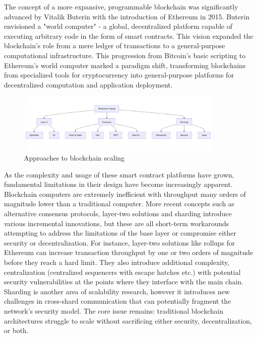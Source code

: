 \documentclass{article}
\begin{document}
The concept of a more expansive, programmable blockchain was significantly advanced by Vitalik Buterin with the introduction of Ethereum in 2015. Buterin envisioned a "world computer" - a global, decentralized platform capable of executing arbitrary code in the form of smart contracts. This vision expanded the blockchain's role from a mere ledger of transactions to a general-purpose computational infrastructure. This progression from Bitcoin's basic scripting to Ethereum's world computer marked a paradigm shift, transforming blockchains from specialized tools for cryptocurrency into general-purpose platforms for decentralized computation and application deployment.

\begin{figure}[H]
    \centering
    \includegraphics[width=0.9\textwidth]{scaling.png}
    \caption{Approaches to blockchain scaling}
    \label{fig:scaling}
\end{figure}


As the complexity and usage of these smart contract platforms have grown, fundamental limitations in their design have become increasingly apparent. Blockchain computers are extremely inefficient with throughput many orders of magnitude lower than a traditional computer. More recent concepts such as alternative consensus protocols, layer-two solutions and sharding introduce various incremental innovations, but these are all short-term workarounds attempting to address the limitations of the base layer or compromise either security or decentralization. For instance, layer-two solutions like rollups for Ethereum can increase transaction throughput by one or two orders of magnitude before they reach a hard limit. They also introduce additional complexity, centralization (centralized sequencers with escape hatches etc.) with potential security vulnerabilities at the points where they interface with the main chain. Sharding is another area of scalability research, however it introduces new challenges in cross-shard communication that can potentially fragment the network's security model. The core issue remains: traditional blockchain architectures struggle to scale without sacrificing either security, decentralization, or both.
\end{document}
